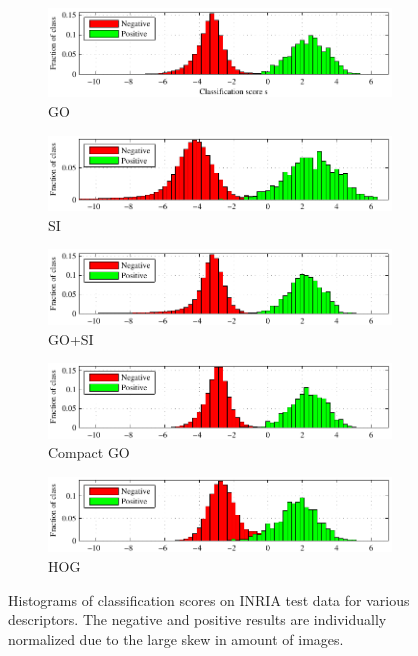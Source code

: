 \documentclass[thesis.tex]{subfiles}
\begin{document}
\begin{figure}
	\centering
	\begin{subfigure}[t]{\textwidth}
		\includegraphics[width=\textwidth]{img/inriaHistogramGoFinal.pdf}
		\caption{GO}
		\label{fig:inriaHistogramGoFinal}
	\end{subfigure}
	\begin{subfigure}[t]{\textwidth}
		\includegraphics[width=\textwidth]{img/inriaHistogramSiFinal.pdf}
		\caption{SI}
		\label{fig:inriaHistogramSiFinal}
	\end{subfigure}
	\begin{subfigure}[t]{\textwidth}
		\includegraphics[width=\textwidth]{img/inriaHistogramGoSiFinal.pdf}
		\caption{GO+SI}
		\label{fig:inriaHistogramGoSiFinal}
	\end{subfigure}
	\begin{subfigure}[t]{\textwidth}
		\includegraphics[width=\textwidth]{img/inriaHistogramGoChosenSmall.pdf}
		\caption{Compact GO}
		\label{fig:inriaHistogramGoChosenSmall}
	\end{subfigure}
	\begin{subfigure}[t]{\textwidth}
		\includegraphics[width=\textwidth]{img/inriaHistogramHog.pdf}
		\caption{HOG}
		\label{fig:inriaHistogramHog}
	\end{subfigure}
	\caption{Histograms of classification scores on INRIA test data for various descriptors. The negative and positive results are individually normalized due to the large skew in amount of images.}
	\label{fig:inriaHistogram}
\end{figure}
%
\subbibliography
\end{document}
